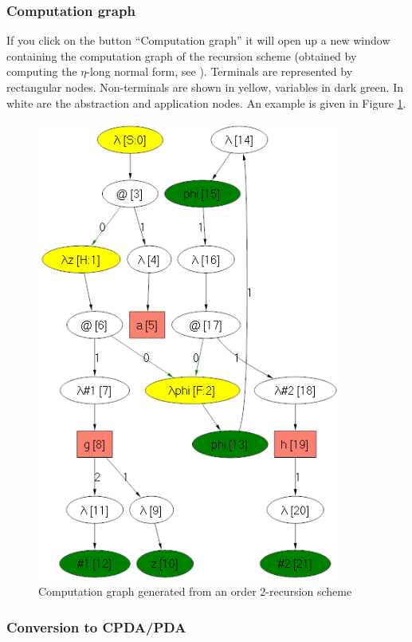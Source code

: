 \documentclass{article}
\begin{document}
\subsubsection{Computation graph}

If you click on the button ``Computation graph'' it will open up a new window containing the computation graph of the recursion scheme (obtained by computing the $\eta$-long normal form, see \cite{OngLics2006}).
Terminals are represented by rectangular nodes. 
Non-terminals are shown in yellow, variables in dark green. In white
are the abstraction and application nodes. An example is given in Figure \ref{fig:compgraph}.

\begin{figure}[htbp]
  \begin{center}  
  \includegraphics[width=10cm]{compgraph}
  \end{center}
  \caption{Computation graph generated from an order $2$-recursion scheme}\label{fig:compgraph}
\end{figure}


\subsubsection{Conversion to CPDA/PDA}
\end{document}

